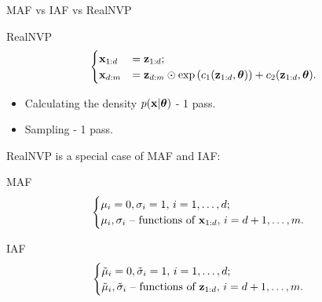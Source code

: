 \begin{frame}{MAF vs IAF vs RealNVP}
	\begin{block}{RealNVP}
		\vspace{-0.3cm}
		\[
			\begin{cases}
				\mathbf{x}_{1:d} &= \mathbf{z}_{1:d}; \\ 
				\mathbf{x}_{d:m} &= \mathbf{z}_{d:m} \odot \exp \left(c_1(\mathbf{z}_{1:d}, \boldsymbol{\theta})\right) + c_2(\mathbf{z}_{1:d}, \boldsymbol{\theta}).
			\end{cases}
		\]
		\vspace{-0.3cm}
	\end{block}
	\begin{itemize}
		\item Calculating the density $p(\mathbf{x} | \boldsymbol{\theta})$ - 1 pass.
		\item Sampling - 1 pass.
	\end{itemize}
	
	RealNVP is a special case of MAF and IAF:
	\begin{block}{MAF}
		\vspace{-0.5cm}
		\begin{equation*}
			\begin{cases}
				\mu_i  = 0, \sigma_i = 1, \, i = 1, \dots, d; \\
				\mu_i, \sigma_i \text{ -- functions of } \mathbf{x}_{1:d}, \, i = d+1, \dots, m.
			\end{cases}
		\end{equation*}
		\vspace{-0.3cm}
	\end{block}
	\begin{block}{IAF}
		\vspace{-0.3cm}
		\begin{equation*}
			\begin{cases}
				\tilde{\mu}_i = 0, \tilde{\sigma}_i = 1, \, i = 1, \dots, d; \\
				\tilde{\mu}_i, \tilde{\sigma}_i \text{ -- functions of } \mathbf{z}_{1:d}, \, i = d+1, \dots, m.
			\end{cases}
		\end{equation*}
	\end{block}
\end{frame}
